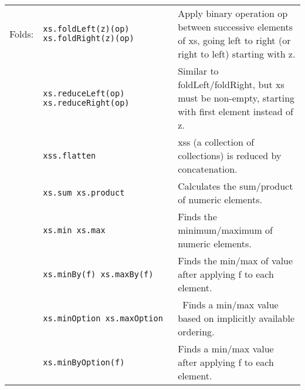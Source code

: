 \documentclass[article, a5paper]{memoir}
\newcommand{\LangColor}{scalared}
\newcommand{\head}[1]{{\bfseries {\color{\LangColor}{#1}}\par\vspace{1mm}\hrule\vspace{-2mm}}}
\newcommand{\Newline}{\vspace{\baselineskip}}
\newcommand{\Comment}[1]{{\color{commentgreen}{#1}}}
\begin{document}
{\begin{tabular}{@{}l p{3.6cm} p{6.8cm}}
  Folds: & \texttt{xs.foldLeft(z)(op) xs.foldRight(z)(op)} & Apply binary operation op between successive elements of xs, going left to right (or right to left) starting with z.\\ \cline{2-3}
      & \texttt{xs.reduceLeft(op) \newline xs.reduceRight(op)} & Similar to foldLeft/foldRight, but xs must be non-empty, starting with first element instead of z.\\ \cline{2-3}
      & \texttt{xss.flatten} & xss (a collection of collections) is reduced by concatenation.\\ \cline{2-3}
      & \texttt{xs.sum xs.product} & Calculates the sum/product of numeric elements.\\\cline{2-3}
      & \texttt{xs.min xs.max} & Finds the minimum/maximum of numeric elements.\\
      & \texttt{xs.minBy(f)~xs.maxBy(f)} & Finds the min/max of value after applying f to each element.\\\cline{2-3}
      & \texttt{xs.minOption~xs.maxOption} & ~Finds a min/max value based on implicitly available ordering.  \\
      & \texttt{xs.minByOption(f)} & Finds a min/max value after applying f to each element. \\\cline{1-3}


\end{tabular}

\hfill \Comment{Iterable[A] contiues on next page...}

}


\clearpage

\vspace*{-1.75em}\head{\texttt{Iterable[A]} ~~(continued)}\Newline
\end{document}
